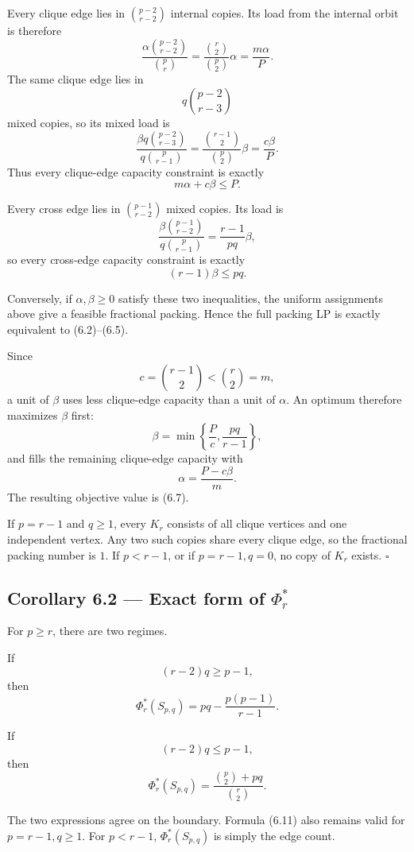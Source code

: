 \documentclass[11pt,a4paper]{article}
\begin{document}
Every clique edge lies in \(\binom{p-2}{r-2}\) internal copies. Its load
from the internal orbit is therefore
\[
\frac{\alpha\binom{p-2}{r-2}}{\binom pr}
=
\frac{\binom r2}{\binom p2}\alpha
=
\frac{m\alpha}{P}.
\]
The same clique edge lies in
\[
q\binom{p-2}{r-3}
\]
mixed copies, so its mixed load is
\[
\frac{\beta q\binom{p-2}{r-3}}
     {q\binom p{r-1}}
=
\frac{\binom{r-1}{2}}{\binom p2}\beta
=
\frac{c\beta}{P}.
\]
Thus every clique-edge capacity constraint is exactly
\[
m\alpha+c\beta\le P.
\]

Every cross edge lies in \(\binom{p-1}{r-2}\) mixed copies. Its load is
\[
\frac{\beta\binom{p-1}{r-2}}
     {q\binom p{r-1}}
=
\frac{r-1}{pq}\beta,
\]
so every cross-edge capacity constraint is exactly
\[
(r-1)\beta\le pq.
\]

Conversely, if \(\alpha,\beta\ge0\) satisfy these two inequalities, the
uniform assignments above give a feasible fractional packing. Hence the
full packing LP is exactly equivalent to (6.2)--(6.5).

Since
\[
c=\binom{r-1}{2}<\binom r2=m,
\]
a unit of \(\beta\) uses less clique-edge capacity than a unit of
\(\alpha\). An optimum therefore maximizes \(\beta\) first:
\[
\beta
=
\min\left\{
\frac Pc,\frac{pq}{r-1}
\right\},
\]
and fills the remaining clique-edge capacity with
\[
\alpha=\frac{P-c\beta}{m}.
\]
The resulting objective value is (6.7).

If \(p=r-1\) and \(q\ge1\), every \(K_r\) consists of all clique vertices
and one independent vertex. Any two such copies share every clique edge,
so the fractional packing number is \(1\). If \(p<r-1\), or if
\(p=r-1,q=0\), no copy of \(K_r\) exists.
\(\square\)

\subsection{\texorpdfstring{Corollary 6.2 --- Exact form of \(\Phi_r^*\)}{Corollary 6.2 --- Exact form of \textbackslash Phi\_r\^{}*}}\label{corollary-6.2-exact-form-of-phi_r}

For \(p\ge r\), there are two regimes.

If
\[
(r-2)q\ge p-1,
\tag{6.10}
\]
then
\[
\boxed{
\Phi_r^*(S_{p,q})
=
pq-\frac{p(p-1)}{r-1}.
}
\tag{6.11}
\]

If
\[
(r-2)q\le p-1,
\tag{6.12}
\]
then
\[
\boxed{
\Phi_r^*(S_{p,q})
=
\frac{\binom p2+pq}{\binom r2}.
}
\tag{6.13}
\]

The two expressions agree on the boundary. Formula (6.11) also remains
valid for \(p=r-1,q\ge1\). For \(p<r-1\), \(\Phi_r^*(S_{p,q})\) is simply
the edge count.
\end{document}
